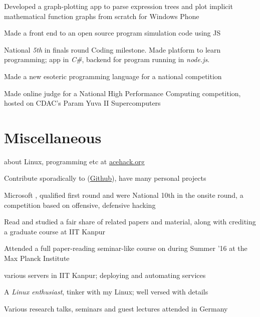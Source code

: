 \documentclass[a4paper]{deedy-resume} %
\begin{document}
\begin{minipage}[t]{0.66\textwidth}
  \runsubsection{}
  \begin{tightitemize}
  \item Developed a graph-plotting app to parse expression trees and
    plot implicit mathematical function graphs from scratch for Windows
    Phone
  \item Made a front end to an open source program simulation code
    using JS
  \item National \textit{5th} in finals round Coding milestone.
    Made platform to learn programming; app in
    \textit{C\#}, backend for program running in \textit{node.js}.
  \end{tightitemize}

  \sectionspace

  \runsubsection{}
  \begin{tightitemize}
  \item Made a new esoteric programming language for a national
    competition
  \item Made online judge for a National High Performance Computing competition, hosted on CDAC’s Param Yuva II Supercomputers
  \end{tightitemize}

  \section{Miscellaneous}
  \vspace{\topsep}
  \begin{tightitemize}
  \item {} about Linux, programming etc at
    \href{http://acehack.org}{acehack.org}
  \item Contribute sporadically to 
    (\href{https://github.com/sakshamsharma}{Github}), have many
    personal projects
  \item Microsoft , qualified first round and were
    National 10th in the onsite round, a competition based on
    offensive, defensive hacking
  \item Read and studied a fair share of  related
    papers and material, along with crediting a graduate course at IIT Kanpur
  \item	Attended a full paper-reading seminar-like course on
     during Summer ’16 at the Max Planck
    Institute
  \item {} various servers in IIT Kanpur; deploying and
    automating services
  \item A \textit{Linux enthusiast}, tinker with my Linux; well versed
    with details
  \item Various research talks, seminars and guest lectures attended
    in Germany
  \end{tightitemize}

\end{minipage}
\end{document}
